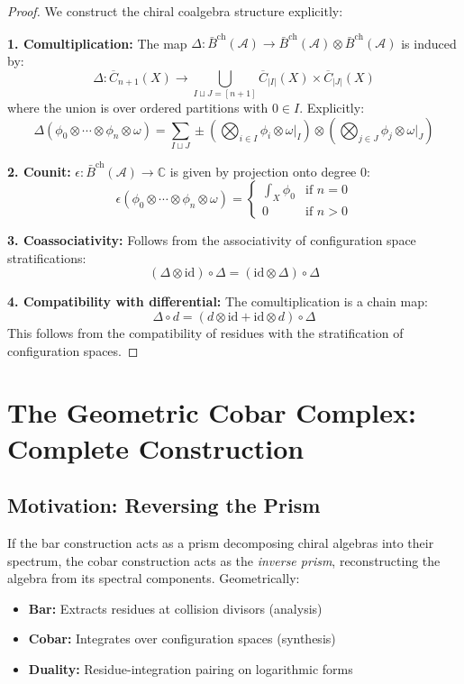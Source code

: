 \begin{proof}
We construct the chiral coalgebra structure explicitly:

\textbf{1. Comultiplication:} The map $\Delta: \bar{B}^{\text{ch}}(\mathcal{A}) \to \bar{B}^{\text{ch}}(\mathcal{A}) \otimes \bar{B}^{\text{ch}}(\mathcal{A})$ is induced by:
\[
\Delta: \overline{C}_{n+1}(X) \to \bigcup_{I \sqcup J = [n+1]} \overline{C}_{|I|}(X) \times \overline{C}_{|J|}(X)
\]
where the union is over ordered partitions with $0 \in I$. Explicitly:
\[
\Delta(\phi_0 \otimes \cdots \otimes \phi_n \otimes \omega) = \sum_{I \sqcup J} \pm \left(\bigotimes_{i \in I} \phi_i \otimes \omega|_I\right) \otimes \left(\bigotimes_{j \in J} \phi_j \otimes \omega|_J\right)
\]

\textbf{2. Counit:} $\epsilon: \bar{B}^{\text{ch}}(\mathcal{A}) \to \mathbb{C}$ is given by projection onto degree 0:
\[
\epsilon(\phi_0 \otimes \cdots \otimes \phi_n \otimes \omega) = \begin{cases}
\int_X \phi_0 & \text{if } n = 0 \\
0 & \text{if } n > 0
\end{cases}
\]

\textbf{3. Coassociativity:} Follows from the associativity of configuration space stratifications:
\[
(\Delta \otimes \text{id}) \circ \Delta = (\text{id} \otimes \Delta) \circ \Delta
\]

\textbf{4. Compatibility with differential:} The comultiplication is a chain map:
\[
\Delta \circ d = (d \otimes \text{id} + \text{id} \otimes d) \circ \Delta
\]
This follows from the compatibility of residues with the stratification of configuration spaces.
\end{proof}

\section{The Geometric Cobar Complex: Complete Construction}

\subsection{Motivation: Reversing the Prism}

\begin{remark}
If the bar construction acts as a prism decomposing chiral algebras into their spectrum, the cobar construction acts as the \emph{inverse prism}, reconstructing the algebra from its spectral components. Geometrically:
\begin{itemize}
\item \textbf{Bar:} Extracts residues at collision divisors (analysis)
\item \textbf{Cobar:} Integrates over configuration spaces (synthesis)
\item \textbf{Duality:} Residue-integration pairing on logarithmic forms
\end{itemize}
\end{remark}

